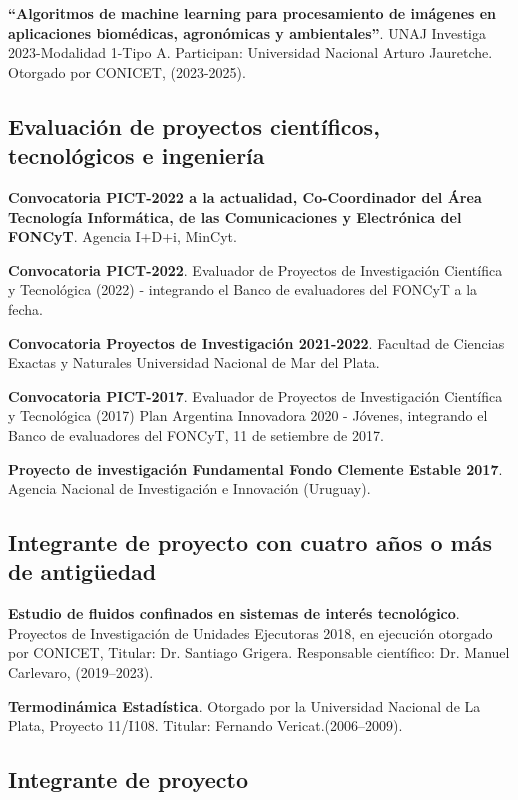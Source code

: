 \documentclass[margin,line]{res}
\begin{document}
\begin{resume}
\textbf{``Algoritmos de machine learning para procesamiento de imágenes en aplicaciones biomédicas, agronómicas y ambientales''}. UNAJ Investiga 2023-Modalidad 1-Tipo A. Participan: Universidad Nacional Arturo Jauretche. Otorgado por CONICET, (2023-2025).

\subsection{ Evaluación de proyectos científicos, tecnológicos e ingeniería}

{\bf Convocatoria PICT-2022 a la actualidad, Co-Coordinador del Área Tecnología Informática, de las Comunicaciones y Electrónica del FONCyT}. Agencia I+D+i, MinCyt.

{\bf Convocatoria PICT-2022}. Evaluador de Proyectos de Investigación Científica y Tecnológica (2022) - integrando el Banco de evaluadores del FONCyT a la fecha.

{\bf Convocatoria Proyectos de Investigación 2021-2022}. Facultad de Ciencias Exactas y Naturales Universidad Nacional de Mar del Plata.

{\bf Convocatoria PICT-2017}. Evaluador de Proyectos de Investigación Científica y Tecnológica (2017) Plan Argentina Innovadora 2020 - Jóvenes, integrando el Banco de evaluadores del FONCyT, 11 de setiembre de 2017.

{\bf Proyecto de investigación Fundamental Fondo Clemente Estable 2017}. Agencia Nacional de Investigación e Innovación (Uruguay).
%

\subsection{ Integrante de proyecto con cuatro años o más de antigüedad}

\textbf{Estudio de fluidos confinados en sistemas de interés tecnológico}. Proyectos de Investigación de Unidades Ejecutoras 2018, en ejecución otorgado por CONICET, Titular: Dr. Santiago Grigera. Responsable científico: Dr. Manuel Carlevaro, (2019--2023). 

\textbf{Termodinámica Estadística}. Otorgado por la Universidad Nacional de La Plata, Proyecto 11/I108. Titular: Fernando Vericat.(2006--2009). 

\subsection{ Integrante de proyecto}


\end{resume}
\end{document}
